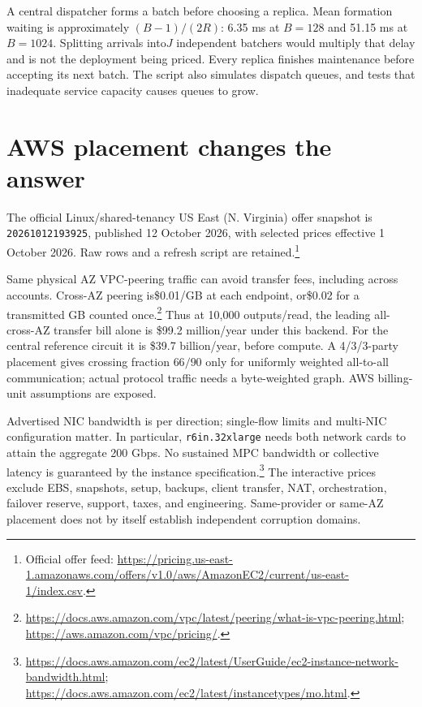 \documentclass[11pt]{article}
\begin{document}
A central dispatcher forms a batch before choosing a replica. Mean formation
waiting is approximately $(B-1)/(2R)$: 6.35 ms at $B=128$ and 51.15 ms at $B=1024$.
Splitting arrivals into$J$ independent batchers would multiply that delay and is
not the deployment being priced. Every replica finishes maintenance before
accepting its next batch. The script also simulates dispatch queues, and tests
that inadequate service capacity causes queues to grow.

\section{AWS placement changes the answer}
The official Linux/shared-tenancy US East (N. Virginia) offer snapshot is
\texttt{20261012193925}, published 12 October 2026, with selected prices effective
1 October 2026. Raw rows and a refresh script are retained.\footnote{Official
offer feed: \url{https://pricing.us-east-1.amazonaws.com/offers/v1.0/aws/AmazonEC2/current/us-east-1/index.csv}.}

Same physical AZ VPC-peering traffic can avoid transfer fees, including across
accounts. Cross-AZ peering is\$0.01/GB at each endpoint, or\$0.02 for a transmitted
GB counted once.\footnote{\url{https://docs.aws.amazon.com/vpc/latest/peering/what-is-vpc-peering.html};
\url{https://aws.amazon.com/vpc/pricing/}.}
Thus at 10,000 outputs/read, the leading all-cross-AZ transfer bill alone is
\$99.2 million/year under this backend. For the central reference circuit it is
\$39.7 billion/year, before compute. A 4/3/3-party placement gives crossing fraction
$66/90$ only for uniformly weighted all-to-all communication; actual protocol
traffic needs a byte-weighted graph. AWS billing-unit assumptions are exposed.

Advertised NIC bandwidth is per direction; single-flow limits and multi-NIC
configuration matter. In particular, \texttt{r6in.32xlarge} needs both network
cards to attain the aggregate 200 Gbps. No sustained MPC bandwidth or collective
latency is guaranteed by the instance specification.\footnote{
\url{https://docs.aws.amazon.com/ec2/latest/UserGuide/ec2-instance-network-bandwidth.html};
\url{https://docs.aws.amazon.com/ec2/latest/instancetypes/mo.html}.}
The interactive prices exclude EBS, snapshots, setup, backups, client transfer, NAT,
orchestration, failover reserve, support, taxes, and engineering. Same-provider
or same-AZ placement does not by itself establish independent corruption domains.


\end{document}
